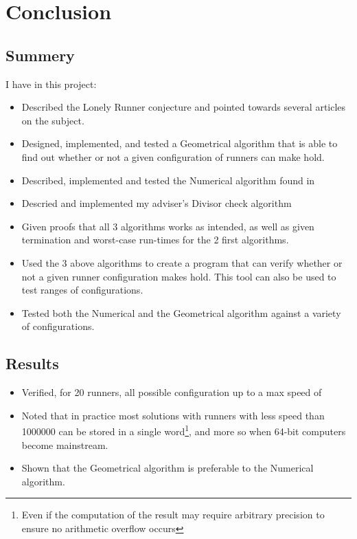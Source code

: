 

\section{Conclusion}
\label{conclusion}

\subsection{Summery}

I have in this project:
\begin{itemize}
\item Described the Lonely Runner conjecture and pointed towards several articles on the subject.
\item Designed, implemented, and tested a Geometrical algorithm that is able to find out whether or not a given configuration of runners can make  hold.
\item Described, implemented and tested the Numerical algorithm found in \cite{invis}
\item Descried and implemented my adviser's Divisor check algorithm
\item Given proofs that all 3 algorithms works as intended, as well as given termination and  worst-case run-times for the 2 first algorithms.
\item Used the 3 above algorithms to create a program that can verify whether or not a given runner configuration makes  hold. This tool can also be used to test ranges of configurations.
\item Tested both the Numerical and the Geometrical algorithm against a variety of configurations.
\end{itemize}

\subsection{Results}
\begin{itemize}
\item Verified, for 20 runners, all possible configuration up to a max speed of \maxNumbers
\item Noted that in practice most solutions with runners with less speed than 1000000 can be stored in a single word\footnote{Even if the computation of the result may require arbitrary precision to ensure no arithmetic overflow occurs}, and more so when 64-bit computers become mainstream.
\item Shown that the Geometrical algorithm is preferable to the Numerical algorithm.
\end{itemize}

